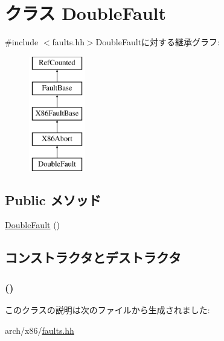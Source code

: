 \hypertarget{classX86ISA_1_1DoubleFault}{
\section{クラス DoubleFault}
\label{classX86ISA_1_1DoubleFault}
}


{\ttfamily \#include $<$faults.hh$>$}DoubleFaultに対する継承グラフ:\begin{figure}[H]
\begin{center}
\leavevmode
\includegraphics[height=5cm]{classX86ISA_1_1DoubleFault}
\end{center}
\end{figure}
\subsection*{Public メソッド}
\begin{DoxyCompactItemize}
\item 
\hyperlink{classX86ISA_1_1DoubleFault_a4962e7623dbb018edb430609eb185075}{DoubleFault} ()
\end{DoxyCompactItemize}


\subsection{コンストラクタとデストラクタ}
\hypertarget{classX86ISA_1_1DoubleFault_a4962e7623dbb018edb430609eb185075}{
\subsubsection[{DoubleFault}]{ ()}}
\label{classX86ISA_1_1DoubleFault_a4962e7623dbb018edb430609eb185075}



\begin{DoxyCode}
266                       :
267             X86Abort("Double-Fault", "#DF", 8, 0)
268         {}
    };
\end{DoxyCode}


このクラスの説明は次のファイルから生成されました:\begin{DoxyCompactItemize}
\item 
arch/x86/\hyperlink{arch_2x86_2faults_8hh}{faults.hh}\end{DoxyCompactItemize}
